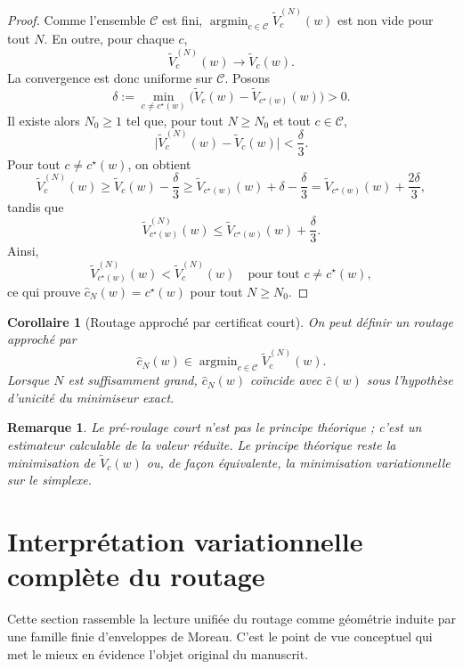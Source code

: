\documentclass[11pt,a4paper]{article}
\newtheorem{corollary}{Corollaire}[section]
\newtheorem{remark}{Remarque}[section]
\DeclareMathOperator{\argmin}{argmin}
\newcommand{\Ccal}{\mathcal C}
\begin{document}
\begin{proof}
Comme l'ensemble \(\Ccal\) est fini, \(\argmin_{c\in\Ccal}\widetilde V_c^{(N)}(w)\) est non vide pour tout \(N\). En outre, pour chaque \(c\),
\[
\widetilde V_c^{(N)}(w)\to \widetilde V_c(w).
\]
La convergence est donc uniforme sur \(\Ccal\). Posons
\[
\delta:=\min_{c\neq c^\star(w)}\bigl(\widetilde V_c(w)-\widetilde V_{c^\star(w)}(w)\bigr)>0.
\]
Il existe alors \(N_0\ge 1\) tel que, pour tout \(N\ge N_0\) et tout \(c\in\Ccal\),
\[
\bigl|\widetilde V_c^{(N)}(w)-\widetilde V_c(w)\bigr|<\frac{\delta}{3}.
\]
Pour tout \(c\neq c^\star(w)\), on obtient
\[
\widetilde V_c^{(N)}(w)
\ge
\widetilde V_c(w)-\frac{\delta}{3}
\ge
\widetilde V_{c^\star(w)}(w)+\delta-\frac{\delta}{3}
=
\widetilde V_{c^\star(w)}(w)+\frac{2\delta}{3},
\]
tandis que
\[
\widetilde V_{c^\star(w)}^{(N)}(w)
\le
\widetilde V_{c^\star(w)}(w)+\frac{\delta}{3}.
\]
Ainsi,
\[
\widetilde V_{c^\star(w)}^{(N)}(w)<\widetilde V_c^{(N)}(w)
\quad\text{pour tout } c\neq c^\star(w),
\]
ce qui prouve \(\hat c_N(w)=c^\star(w)\) pour tout \(N\ge N_0\).
\end{proof}

\begin{corollary}[Routage approché par certificat court]
On peut définir un routage approché par
\[
\hat c_N(w)\in\argmin_{c\in\Ccal}\widetilde V_c^{(N)}(w).
\]
Lorsque \(N\) est suffisamment grand, \(\hat c_N(w)\) coïncide avec \(\hat c(w)\) sous l'hypothèse d'unicité du minimiseur exact.
\end{corollary}

\begin{remark}
Le pré-roulage court n'est pas le principe théorique ; c'est un estimateur calculable de la valeur réduite. Le principe théorique reste la minimisation de \(\widetilde V_c(w)\) ou, de façon équivalente, la minimisation variationnelle sur le simplexe.
\end{remark}

\section{Interprétation variationnelle complète du routage}

Cette section rassemble la lecture unifiée du routage comme géométrie induite par une famille finie d'enveloppes de Moreau. C'est le point de vue conceptuel qui met le mieux en évidence l'objet original du manuscrit.
\end{document}
